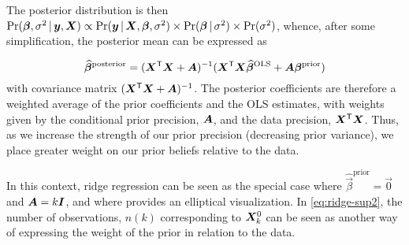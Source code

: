 The posterior distribution is then
$\Pr (\bm{\beta}, \sigma^2 \, | \, \bm{y}, \bm{X}) \propto \Pr (\bm{y} \, | \, \bm{X}, \bm{\beta}, \sigma^2) \times
\Pr (\bm{\beta} \, | \, \sigma^2) \times \Pr (\sigma^2)$,
whence, after some simplification,
the posterior mean can be expressed as

\begin{equation}\label{eq:bayes-posterior}
\widehat{\bm{\beta}}^{\mathrm{posterior}} =
(\bm{X}^\mathsf{T} \bm{X}+\bm{A})^{-1}
(\bm{X}^\mathsf{T} \bm{X}\widehat{\bm{\beta}}^{\mathrm{OLS}} + \bm{A} \bm{\beta}^{\mathrm{prior}})
\end{equation}
with covariance matrix $(\bm{X}^\mathsf{T} \bm{X}+\bm{A})^{-1}$. The posterior coefficients are 
therefore a weighted average of
the prior coefficients and the OLS estimates, with weights given by the conditional prior precision, $\bm{A}$,
and the data precision, $\bm{X}^\mathsf{T}\bm{X}$.  Thus, as we increase the strength of our prior precision (decreasing
prior variance), we place greater weight on our prior beliefs relative to the data.

In this context, ridge regression can be seen as the special case 
where $\widehat{\vec{\beta}}^{\mathrm{prior}} = \vec{0}$ and $\bm{A} = k \bm{I}$,
and where  provides an elliptical visualization. In \eqref{eq:ridge-sup2}, the number of observations,
$n(k)$ corresponding to $\bm{X}_k^0$ can be seen as another way of expressing the weight of the prior in relation to the data.




